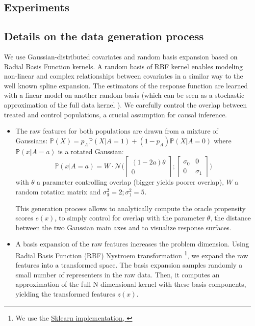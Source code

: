 \documentclass[french,12pt,twoside,a4paper]{book}
\begin{document}
\begin{appendices}
  \section{Experiments}

  \subsection{Details on the data generation process}
  \label{apd:experiments:generation}

  We use Gaussian-distributed covariates and random basis expansion based on
  Radial Basis Function kernels. A random basis of RBF kernel enables modeling
  non-linear and complex relationships between covariates in a similar way to the
  well known spline expansion. The estimators of the response function are learned
  with a linear model on another random basis (which can be seen as a stochastic
  approximation of the full data kernel \citep{rahimi_random_2008}). We
  carefully control the overlap between treated and control populations,
  a crucial assumption for causal inference.

  \begin{itemize}
    \item The raw features for both populations are drawn from a mixture of
          Gaussians:
          $\mathbb P(X) = p_A \mathbb P(X|A=1) + (1- p_A) \mathbb P(X|A=0)$
          where $\mathbb P(x|A=a)$ is a rotated Gaussian:
          \begin{equation}
            \mathbb P(x|A=a) = W \cdot \mathcal N \Big( \begin{bmatrix} (1-2a) \theta \\ 0\end{bmatrix} ; \begin{bmatrix} \sigma_0 & 0 \\ 0 & \sigma_1\end{bmatrix} \Big)
          \end{equation}
          with $\theta$ a parameter controlling overlap (bigger yields poorer
          overlap), $W$ a random rotation matrix and $\sigma_0^2=2;\sigma_1^2=5$.

          This generation process allows to analytically compute the oracle
          propensity scores $e(x)$, to simply control for overlap with the
          parameter $\theta$, the distance between the two Gaussian main axes and
          to  visualize response surfaces.

    \item A basis expansion of the raw features increases the problem dimension.
          Using Radial Basis Function (RBF) Nystroem transformation \footnote{We use the
            \href{https://scikit-learn.org/stable/modules/generated/sklearn.kernel_approximation.Nystroem.html}{Sklearn
              implementation, \citep{pedregosa_scikitlearn_2011}}}, we expand the raw
          features into a transformed space. The basis expansion samples randomly a
          small number of representers in the raw data. Then,  it computes an
          approximation of the full N-dimensional kernel with these basis components,
          yielding the transformed features $z(x)$.


\end{itemize}
\end{appendices}
\end{document}
